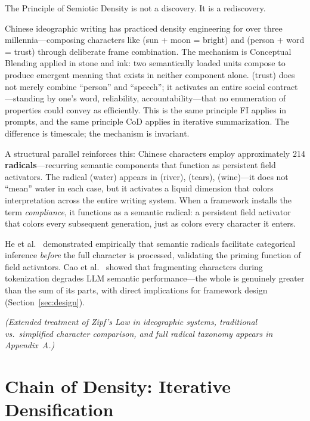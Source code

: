 \documentclass[12pt,a4paper]{article}
\begin{document}
The Principle of Semiotic Density is not a discovery.
It is a rediscovery.

Chinese ideographic writing has practiced density engineering for over three millennia---composing characters like  (sun + moon = bright) and  (person + word = trust) through deliberate frame combination.
The mechanism is Conceptual Blending \cite{fauconnier2002} applied in stone and ink: two semantically loaded units compose to produce emergent meaning that exists in neither component alone.
 (trust) does not merely combine ``person'' and ``speech''; it activates an entire social contract---standing by one's word, reliability, accountability---that no enumeration of properties could convey as efficiently.
This is the same principle FI applies in prompts, and the same principle CoD applies in iterative summarization.
The difference is timescale; the mechanism is invariant.

A structural parallel reinforces this: Chinese characters employ approximately 214 \textbf{radicals}---recurring semantic components that function as persistent field activators.
The radical  (water) appears in  (river),  (tears),  (wine)---it does not ``mean'' water in each case, but it activates a liquid dimension that colors interpretation across the entire writing system.
When a framework installs the term \textit{compliance}, it functions as a semantic radical: a persistent field activator that colors every subsequent generation, just as  colors every character it enters.

He et al.\ \cite{he2018} demonstrated empirically that semantic radicals facilitate categorical inference \textit{before} the full character is processed, validating the priming function of field activators.
Cao et al.\ \cite{cao2025} showed that fragmenting characters during tokenization degrades LLM semantic performance---the whole is genuinely greater than the sum of its parts, with direct implications for framework design (Section~\ref{sec:design}).

\medskip
\noindent\textit{(Extended treatment of Zipf's Law in ideographic systems, traditional vs.\ simplified character comparison, and full radical taxonomy appears in Appendix~A.)}


\section{Chain of Density: Iterative Densification}
\label{sec:cod}
\end{document}
